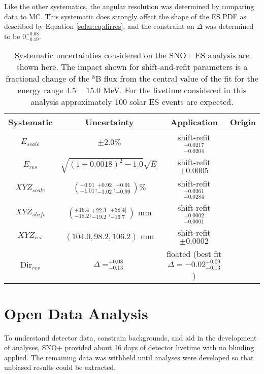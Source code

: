 Like the other systematics, the angular resolution was determined by comparing \N data to MC. 
This systematic does strongly affect the shape of the ES PDF as described by Equation \ref{solar:eq:dirres}, and the constraint on $\Delta$ was determined to be $0^{+0.08}_{-0.19}$.

\begin{table}[]
\begin{center}
\begin{tabular}{c|c|c|c}
Systematic & Uncertainty & Application & Origin \\ \hline
$E_{scale}$     & $\pm 2.0\%$ & shift-refit $^{+0.0217}_{-0.0204}$ & \N \rule{0pt}{2.6ex}\rule[-1.2ex]{0pt}{0pt}  \\
$E_{res}$       & $\sqrt{(1+0.0018)^2-1.0}\sqrt{E}$ & shift-refit $\pm 0.0005$ & \N  \rule{0pt}{2.6ex}\rule[-1.2ex]{0pt}{0pt}  \\
${XYZ}_{scale}$ & $(^{+0.91}_{-1.01},^{+0.92}_{-1.02},^{+0.91}_{-0.99}) \%$ & shift-refit $^{+0.0261}_{-0.0284}$ & \N  \rule{0pt}{2.6ex}\rule[-1.2ex]{0pt}{0pt}  \\
${XYZ}_{shift}$ & $(^{+16.4}_{-18.2},^{+22.3}_{-19.2},^{+38.4]}_{-16.7})$ mm & shift-refit $^{+0.0002}_{-0.0001}$ & \N  \rule{0pt}{2.6ex}\rule[-1.2ex]{0pt}{0pt}  \\
${XYZ}_{res}$ & $(104.0,98.2,106.2)$ mm & shift-refit $\pm 0.0002$ & \N \rule{0pt}{2.6ex}\rule[-1.2ex]{0pt}{0pt}  \\
Dir$_{res}$     &  $\Delta = ^{+0.08}_{-0.13}$ & floated (best fit $\Delta = -0.02^{+0.09}_{-0.13}$) & \N \rule{0pt}{2.6ex}\rule[-1.2ex]{0pt}{0pt}  \\ \hline
\end{tabular}
\caption{ Systematic uncertainties considered on the SNO+ ES analysis are shown here.
The impact shown for shift-and-refit parameters is a fractional change of the $^8$B flux from the central value of the fit for the energy range $4.5-15.0$ MeV.
For the livetime considered in this analysis approximately 100 solar ES events are expected.}
\label{tbl:solar:updated_syst}
\end{center}
\end{table}


\section{Open Data Analysis}
\label{sec:solar:opendata}

To understand detector data, constrain backgrounds, and aid in the development of analyses, SNO+ provided about 16 days of detector livetime with no blinding applied.
The remaining data was withheld until analyses were developed so that unbiased results could be extracted.

